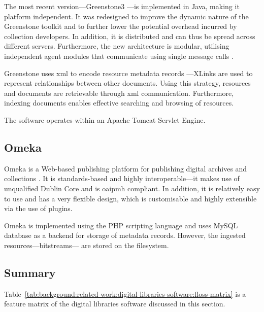 The most recent version---Greenstone3 \citep{Greenstone3}---is implemented in Java, making it platform independent. It was redesigned to improve the dynamic nature of the Greenstone toolkit and to further lower the potential overhead incurred by collection developers. In addition, it is distributed and can thus be spread across different servers. Furthermore, the new architecture is modular, utilising independent agent modules that communicate using single message calls \citep{Bainbridge2004}.

Greenstone uses \gls{xml} to encode resource metadata records ---XLinks are used to represent relationships between other documents. Using this strategy, resources and documents are retrievable through \gls{xml} communication. Furthermore, indexing documents enables effective searching and browsing of resources. 

The software operates within an Apache Tomcat Servlet Engine.

\subsection{Omeka}

Omeka is a Web-based publishing platform for publishing digital archives and collections \citep{Kucsma2010}. It is standards-based and highly interoperable---it makes use of unqualified Dublin Core and is \gls{oaipmh} compliant. In addition, it is relatively easy to use and has a very flexible design, which is customisable and highly extensible via the use of plugins.

Omeka is implemented using the PHP scripting language and uses MySQL database as a backend for storage of metadata records. However, the ingested resources---bitstreams--- are stored on the filesystem.

\subsection{Summary}

Table~\ref{tab:background:related-work:digital-libraries-software:floss-matrix} is a feature matrix of the digital libraries software discussed in this section.

\tablespacing

\bodyspacing